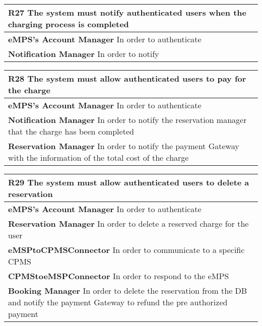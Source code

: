 \begin{table}[H]
    \begin{tabularx}{\textwidth}{X}
        \toprule
        \textbf{R27} The system must notify authenticated users when the charging process is completed \\ \midrule
        \textbf{eMPS's Account Manager} In order to authenticate                                       \\
        \textbf{Notification Manager} In order to notify                                               \\
    \end{tabularx}
\end{table}
\begin{table}[H]
    \begin{tabularx}{\textwidth}{X}
        \toprule
        \textbf{R28} The system must allow authenticated users to pay for the charge                                             \\ \midrule
        \textbf{eMPS's Account Manager} In order to authenticate                                                                 \\
        \textbf{Notification Manager} In order to notify the reservation manager that the charge has been completed              \\
        \textbf{Reservation Manager} In order to notify the payment Gateway with the information of the total cost of the charge \\
    \end{tabularx}
\end{table}
\begin{table}[H]
    \begin{tabularx}{\textwidth}{X}
        \toprule
        \textbf{R29} The system must allow authenticated users to delete a reservation                                                              \\ \midrule
        \textbf{eMPS's Account Manager} In order to authenticate                                                                                    \\
        \textbf{Reservation Manager} In order to delete a reserved charge for the user                                                              \\
        \textbf{eMSPtoCPMSConnector} In order to communicate to a specific CPMS                                                                     \\
        \textbf{CPMStoeMSPConnector} In order to respond to the eMPS                                                                                \\
        \textbf{Booking Manager} In order to delete the reservation from the DB and notify the payment Gateway to refund the pre authorized payment \\
    \end{tabularx}
\end{table}
